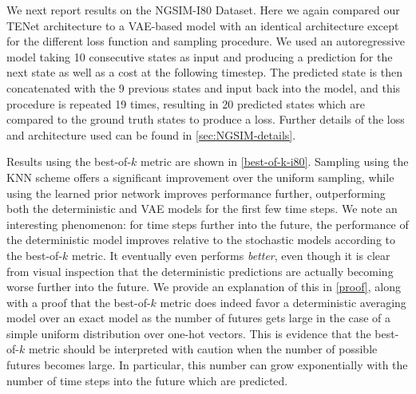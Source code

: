 \documentclass{article}
\begin{document}
We next report results on the NGSIM-I80 Dataset.
Here we again compared our TENet architecture to a VAE-based model with an identical architecture except for the different loss function and sampling procedure.
We used an autoregressive model taking 10 consecutive states as input and producing a prediction for the next state as well as a cost at the following timestep.
The predicted state is then concatenated with the 9 previous states and input back into the model, and this procedure is repeated 19 times, resulting in 20 predicted states which are compared to the ground truth states to produce a loss.
Further details of the loss and architecture used can be found in \cref{sec:NGSIM-details}.

Results using the best-of-$k$ metric are shown in \cref{best-of-k-i80}.
Sampling using the KNN scheme offers a significant improvement over the uniform sampling, while using the learned prior network improves performance further, outperforming both the deterministic and VAE models for the first few time steps.
We note an interesting phenomenon: for time steps further into the future, the performance of the deterministic model improves relative to the stochastic models according to the best-of-$k$ metric.
It eventually even performs \emph{better}, even though it is clear from visual inspection that the deterministic predictions are actually becoming worse further into the future.
We provide an explanation of this in \cref{proof}, along with a proof that the best-of-$k$ metric does indeed favor a deterministic averaging model over an exact model as the number of futures gets large in the case of a simple uniform distribution over one-hot vectors.
This is evidence that the best-of-$k$ metric should be interpreted with caution when the number of possible futures becomes large.
In particular, this number can grow exponentially with the number of time steps into the future which are predicted.
\end{document}
